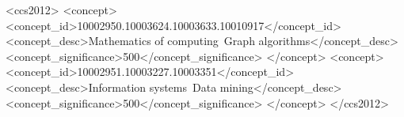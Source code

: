 \documentclass[sigconf]{acmart}
\begin{document}




\begin{CCSXML}
<ccs2012>
   <concept>
       <concept_id>10002950.10003624.10003633.10010917</concept_id>
       <concept_desc>Mathematics of computing~Graph algorithms</concept_desc>
       <concept_significance>500</concept_significance>
       </concept>
   <concept>
       <concept_id>10002951.10003227.10003351</concept_id>
       <concept_desc>Information systems~Data mining</concept_desc>
       <concept_significance>500</concept_significance>
       </concept>
 </ccs2012>
\end{CCSXML}






\maketitle






%

%






\balance
%





\appendix

%
\end{document}
